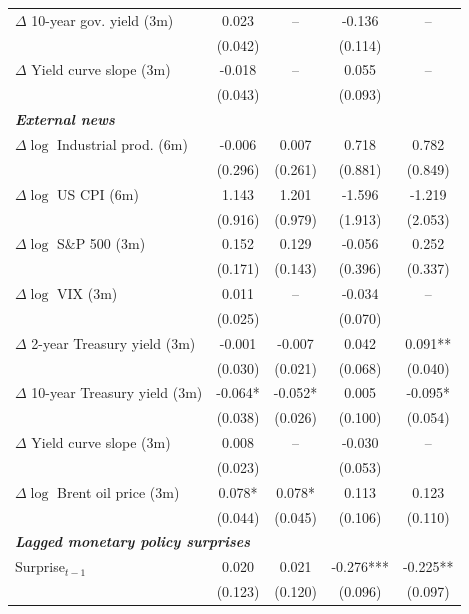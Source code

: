 \documentclass[\latexroot/\projectname]{subfiles}
\begin{document}
\begin{table}[htbp]
\begin{center}
{\begin{tabular}{lcccc}
$\Delta$ 10-year gov. yield (3m)
& 0.023 & -- 
& -0.136 & -- \\
& (0.042) & 
& (0.114) & \\

$\Delta$ Yield curve slope (3m)
& -0.018 & -- 
& 0.055 & -- \\
& (0.043) & 
& (0.093) & \\[0.4em]

\multicolumn{5}{l}{\textbf{\emph{External news}}} \\[0.2em]

$\Delta \log$ Industrial prod. (6m)
& -0.006 & 0.007 
& 0.718 & 0.782 \\
& (0.296) & (0.261)
& (0.881) & (0.849) \\

$\Delta \log$ US CPI (6m)
& 1.143 & 1.201 
& -1.596 & -1.219 \\
& (0.916) & (0.979)
& (1.913) & (2.053) \\

$\Delta \log$ S\&P 500 (3m)
& 0.152 & 0.129 
& -0.056 & 0.252 \\
& (0.171) & (0.143)
& (0.396) & (0.337) \\

$\Delta \log$ VIX (3m)
& 0.011 & -- 
& -0.034 & -- \\
& (0.025) & 
& (0.070) & \\

$\Delta$ 2-year Treasury yield (3m)
& -0.001 & -0.007 
& 0.042 & 0.091** \\
& (0.030) & (0.021)
& (0.068) & (0.040) \\

$\Delta$ 10-year Treasury yield (3m)
& -0.064* & -0.052* 
& 0.005 & -0.095* \\
& (0.038) & (0.026)
& (0.100) & (0.054) \\

$\Delta$ Yield curve slope (3m)
& 0.008 & -- 
& -0.030 & -- \\
& (0.023) & 
& (0.053) & \\

$\Delta \log$ Brent oil price (3m)
& 0.078* & 0.078* 
& 0.113 & 0.123 \\
& (0.044) & (0.045)
& (0.106) & (0.110) \\[0.4em]

\multicolumn{5}{l}{\textbf{\emph{Lagged monetary policy surprises}}} \\[0.2em]

Surprise$_{t-1}$
& 0.020 & 0.021 
& -0.276*** & -0.225** \\
& (0.123) & (0.120)
& (0.096) & (0.097) \\


\end{tabular}}
\end{center}
\end{table}
\end{document}
